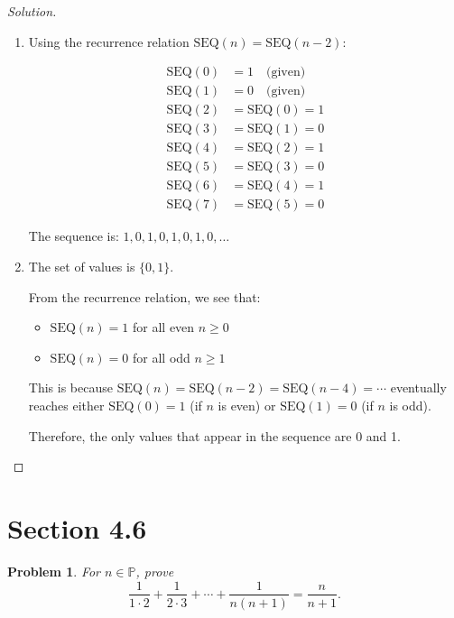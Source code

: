 \documentclass[12pt]{article}
\newtheorem{problem}{Problem}
\newcommand{\PP}{\ensuremath{\mathbb{P}}}
\begin{document}
\begin{proof}[Solution]
~
\begin{enumerate}[label=(\alph*)]
    \item Using the recurrence relation $\text{SEQ}(n) = \text{SEQ}(n-2)$:
    
    \begin{align*}
    \text{SEQ}(0) &= 1 \quad \text{(given)} \\
    \text{SEQ}(1) &= 0 \quad \text{(given)} \\
    \text{SEQ}(2) &= \text{SEQ}(0) = 1 \\
    \text{SEQ}(3) &= \text{SEQ}(1) = 0 \\
    \text{SEQ}(4) &= \text{SEQ}(2) = 1 \\
    \text{SEQ}(5) &= \text{SEQ}(3) = 0 \\
    \text{SEQ}(6) &= \text{SEQ}(4) = 1 \\
    \text{SEQ}(7) &= \text{SEQ}(5) = 0
    \end{align*}
    
    The sequence is: $1, 0, 1, 0, 1, 0, 1, 0, \ldots$
    
    \item The set of values is $\{0, 1\}$.
    
    From the recurrence relation, we see that:
    \begin{itemize}
        \item $\text{SEQ}(n) = 1$ for all even $n \geq 0$
        \item $\text{SEQ}(n) = 0$ for all odd $n \geq 1$
    \end{itemize}
    
    This is because $\text{SEQ}(n) = \text{SEQ}(n-2) = \text{SEQ}(n-4) = \cdots$ eventually reaches either $\text{SEQ}(0) = 1$ (if $n$ is even) or $\text{SEQ}(1) = 0$ (if $n$ is odd).
    
    Therefore, the only values that appear in the sequence are 0 and 1.
\end{enumerate}
\end{proof}
\newpage
\section*{Section 4.6}

\setcounter{problem}{1}
\begin{problem}
For $n \in \PP$, prove
$$\frac{1}{1 \cdot 2} + \frac{1}{2 \cdot 3} + \cdots + \frac{1}{n(n+1)} = \frac{n}{n+1}.$$
\end{problem}
\end{document}
